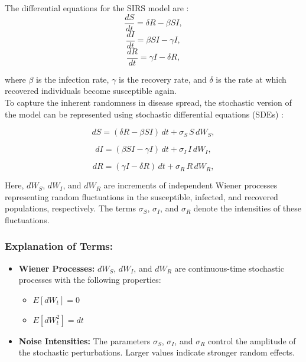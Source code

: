 \noindent
The differential equations for the SIRS model are \cite{hethcote2000, anderson1992}:
\begin{equation}
\frac{dS}{dt} = \delta R - \beta SI,
\label{equation:3.1}
\end{equation}
\begin{equation}
\frac{dI}{dt} = \beta SI - \gamma I,
\label{equation:3.2}
\end{equation}
\begin{equation}
\frac{dR}{dt} = \gamma I - \delta R,
\label{equation:3.3}
\end{equation}

where $\beta$ is the infection rate, $\gamma$ is the recovery rate, and $\delta$ is the rate at which recovered individuals become susceptible again.\\

\noindent
To capture the inherent randomness in disease spread, the stochastic version of the model can be represented using stochastic differential equations (SDEs) \cite{liu2020, jiang2017}:

\begin{equation}
dS = \left(\delta R - \beta SI\right) \, dt + \sigma_S \, S \, dW_S,
\label{equation:3.4}
\end{equation}

\begin{equation}
dI = \left(\beta SI - \gamma I\right) \, dt + \sigma_I \, I \, dW_I,
\label{equation:3.5}
\end{equation}

\begin{equation}
dR = \left(\gamma I - \delta R\right) \, dt + \sigma_R \, R \, dW_R,
\label{equation:3.6}
\end{equation}

\noindent
Here, \(dW_S\), \(dW_I\), and \(dW_R\) are increments of independent Wiener processes representing random fluctuations in the susceptible, infected, and recovered populations, respectively. The terms \(\sigma_S\), \(\sigma_I\), and \(\sigma_R\) denote the intensities of these fluctuations.

\subsubsection*{Explanation of Terms:}
\begin{itemize}
    \item \textbf{Wiener Processes:} \(dW_S\), \(dW_I\), and \(dW_R\) are continuous-time stochastic processes with the following properties:
    \begin{itemize}
        \item \(E[dW_t] = 0\)
        \item \(E[dW_t^2] = dt\)
    \end{itemize}
    \item \textbf{Noise Intensities:} The parameters \(\sigma_S\), \(\sigma_I\), and \(\sigma_R\) control the amplitude of the stochastic perturbations. Larger values indicate stronger random effects.
\end{itemize}

